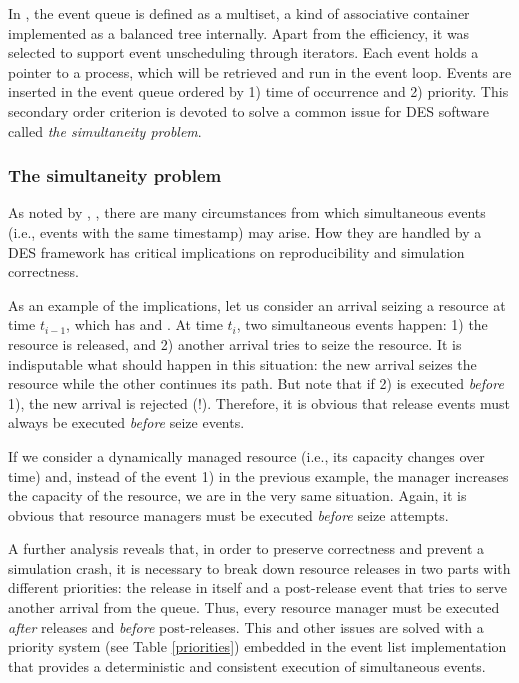 \documentclass[
  nojss]{jss}
\begin{document}
In , the event queue is defined as a 
multiset, a kind of associative container implemented as a balanced tree
internally. Apart from the efficiency, it was selected to support event
unscheduling through iterators. Each event holds a pointer to a process,
which will be retrieved and run in the event loop. Events are inserted
in the event queue ordered by 1) time of occurrence and 2) priority.
This secondary order criterion is devoted to solve a common issue for
DES software called \emph{the simultaneity problem}.

\hypertarget{the-simultaneity-problem}{%
\subsubsection{The simultaneity
problem}\label{the-simultaneity-problem}}

As noted by \citet{Ronngren:1999:EOP:301429.301456},
\citet{Jha:2000:SEL:361026.361032}, there are many circumstances from
which simultaneous events (i.e., events with the same timestamp) may
arise. How they are handled by a DES framework has critical implications
on reproducibility and simulation correctness.

As an example of the implications, let us consider an arrival seizing a
resource at time \(t_{i-1}\), which has  and
. At time \(t_{i}\), two simultaneous events happen:
1) the resource is released, and 2) another arrival tries to seize the
resource. It is indisputable what should happen in this situation: the
new arrival seizes the resource while the other continues its path. But
note that if 2) is executed \emph{before} 1), the new arrival is
rejected (!). Therefore, it is obvious that release events must always
be executed \emph{before} seize events.

If we consider a dynamically managed resource (i.e., its capacity
changes over time) and, instead of the event 1) in the previous example,
the manager increases the capacity of the resource, we are in the very
same situation. Again, it is obvious that resource managers must be
executed \emph{before} seize attempts.

A further analysis reveals that, in order to preserve correctness and
prevent a simulation crash, it is necessary to break down resource
releases in two parts with different priorities: the release in itself
and a post-release event that tries to serve another arrival from the
queue. Thus, every resource manager must be executed \emph{after}
releases and \emph{before} post-releases. This and other issues are
solved with a priority system (see Table \ref{priorities}) embedded in
the event list implementation that provides a deterministic and
consistent execution of simultaneous events.
\end{document}
